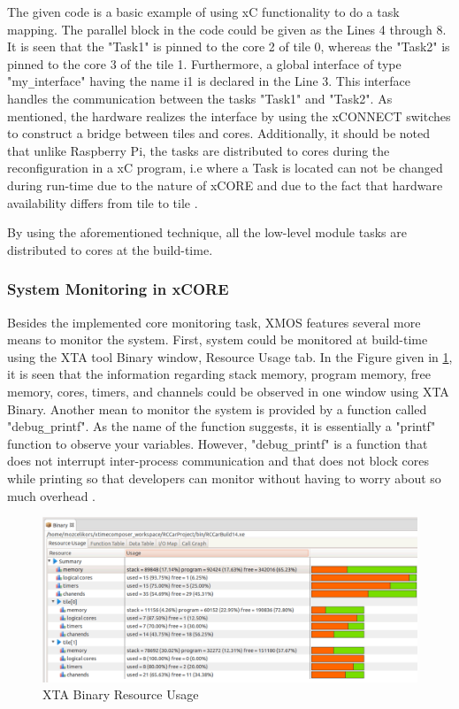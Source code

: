 The given code is a basic example of using xC functionality to do a task mapping. The parallel block in the code could be given as the Lines 4 through 8. It is seen that the "Task1" is pinned to the core 2 of tile 0, whereas the "Task2" is pinned to the core 3 of the tile 1. Furthermore, a global interface of type "my\texttt{\_}interface" having the name i1 is declared in the Line 3. This interface handles the communication between the tasks "Task1" and "Task2". As mentioned, the hardware realizes the interface by using the xCONNECT switches to construct a bridge between tiles and cores. Additionally, it should be noted that unlike Raspberry Pi, the tasks are distributed to cores during the reconfiguration in a xC program, i.e where a Task is located can not be changed during run-time due to the nature of xCORE and due to the fact that hardware availability differs from tile to tile \cite{xmosprogrguide}.

By using the aforementioned technique, all the low-level module tasks are distributed to cores at the build-time. 

\subsubsection{System Monitoring in xCORE}
Besides the implemented core monitoring task, XMOS features several more means to monitor the system. First, system could be monitored at build-time using the XTA tool Binary window, Resource Usage tab. In the Figure given in \ref{fig:binaryresourceusage}, it is seen that the information regarding stack memory, program memory, free memory, cores, timers, and channels could be observed in one window using XTA Binary. Another mean to monitor the system is provided by a function called "debug\texttt{\_}printf". As the name of the function suggests, it is essentially a "printf" function to observe your variables. However, "debug\texttt{\_}printf" is a function that does not interrupt inter-process communication and that does not block cores while printing so that developers can monitor without having to worry about so much overhead \cite{xmosprogrguide}.

\begin{figure}[!ht]
	\centering
	\includegraphics[width=\textwidth]{content/images/binaryresourceusage.png}
	\caption{XTA Binary Resource Usage}
	\label{fig:binaryresourceusage}
\end{figure}

